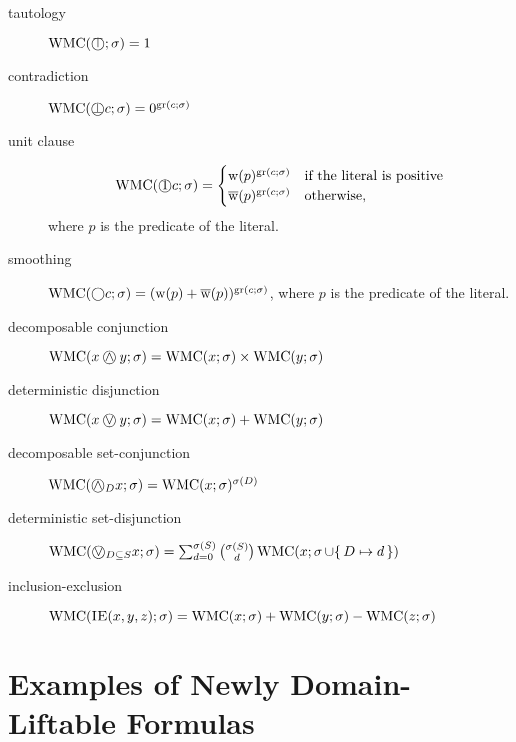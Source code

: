 \begin{description}
\item[tautology] $\WMC(\Tautology; \size) = 1$
\item[contradiction] $\WMC(\Contradiction c; \size) = 0^{\gr(c; \size)}$
\item[unit clause]
  \[
  \WMC(\Unit c; \size) =
  \begin{cases}
    \wwp(p)^{\gr(c; \size)} & \text{if the literal is positive} \\
    \wwn(p)^{\gr(c; \size)} & \text{otherwise,}
  \end{cases}
  \]
  where $p$ is the predicate of the literal.
\item[smoothing] $\WMC(\Smoothing c; \size) = (\wwp(p) + \wwn(p))^{\gr(c; \size)}$, where $p$ is the predicate of the literal.
\item[decomposable conjunction] $\WMC(x \oland y; \size) = \WMC(x; \size) \times \WMC(y; \size)$
\item[deterministic disjunction] $\WMC(x \olor y; \size) = \WMC(x; \size) + \WMC(y; \size)$
\item[decomposable set-conjunction] $\WMC(\oland_D x; \size) = \WMC(x; \size)^{\size(D)}$
\item[deterministic set-disjunction] $\WMC(\olor_{D \subseteq S} x; \size) = \sum_{d = 0}^{\size(S)} \binom{\size(S)}{d} \WMC(x; \size \cup \{\, D \mapsto d \,\})$
\item[inclusion-exclusion] $\operatorname{WMC}(\operatorname{\textsc{IE}}(x, y, z); \operatorname{\sigma}) = \operatorname{WMC}(x; \operatorname{\sigma}) + \operatorname{WMC}(y; \operatorname{\sigma}) - \operatorname{WMC}(z; \operatorname{\sigma})$
\end{description}

\section{Examples of Newly Domain-Liftable Formulas}


